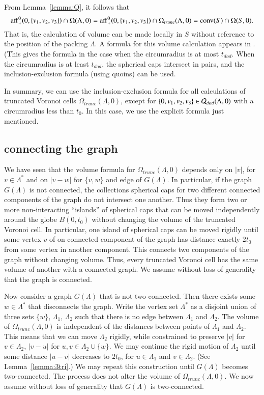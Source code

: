 From Lemma~\ref{lemma:Q}, it follows that
\begin{equation}\label{eqn:omega-3}
{\operatorname{aff}}^0_+(0,\{v_1,v_2,v_3\}) \cap \Omega(\Lambda,0) = 
{\operatorname{aff}}^0_+(0,\{v_1,v_2,v_3\}) \cap \Omega_{trunc}(\Lambda,0) = 
{\operatorname{conv}}(S)\cap\Omega(S,0).
\end{equation}
That is, the calculation of volume can be made locally in $S$ without
reference to the position of the packing $\Lambda$.
A formula for this volume calculation appears in 
\cite[sec.~8.6.3]{Part1}.  (This gives the formula in the case
when the circumradius is at most $t_{dod}$.  When the circumradius
is at least $t_{dod}$, the spherical caps intersect in pairs,
and the inclusion-exclusion formula (using quoins)
can be used.

In summary, we can use the inclusion-exclusion formula for all
calculations of truncated Voronoi cells $\Omega_{trunc}(\Lambda,0)$,
except for $\{0,v_1,v_2,v_3\}\in {\mathcal Q}_{dod}(\Lambda,0)$ with
a circumradius less than $t_0$.  In this case, we use
the explicit formula just mentioned.

\subsection{connecting the graph}

We have seen that the volume formula for $\Omega_{trunc}(\Lambda,0)$
depends only on $|v|$, for $v\in\Lambda^*$ and on
$|v-w|$ for $\{v,w\}$ and edge of $G(\Lambda)$.
In particular, if the graph $G(\Lambda)$ is not connected, the
collections spherical caps for two different connected components
of the graph do not intersect one another.  Thus they form
two or more non-interacting ``islands'' of spherical caps that
can be moved independently around the globe $B(0,t_0)$
without changing the volume of
the truncated Voronoi cell.  In particular, one island of spherical
caps can be moved rigidly until some vertex $v$ of on connected
component of the graph has distance exactly $2t_0$ from some
vertex in another component.  This connects two components of the
graph without changing volume.  Thus, every truncated Voronoi cell
has the same volume of another with a connected graph.  We
assume without loss of generality that the graph is connected.

Now consider a graph $G(\Lambda)$ that is not two-connected.
Then there exists some $w\in \Lambda^*$ that disconnects
the graph.  Write the vertex set $\Lambda^*$
as a disjoint union of three sets
$\{w\}$, $\Lambda_1$, $\Lambda_2$ such that there is no edge between
$\Lambda_1$ and $\Lambda_2$.  The volume of $\Omega_{trunc}(\Lambda,0)$
is independent of the distances between points of $\Lambda_1$ and
$\Lambda_2$.  This means that we can move $\Lambda_2$ rigidly,
while constrained to preserve $|v|$ for $v\in\Lambda_2$, $|v-u|$
for $u,v\in \Lambda_2\cup\{w\}$. 
We may continue the rigid motion of $\Lambda_2$ until some distance
$|u-v|$ decreases to $2t_0$, for
$u\in\Lambda_1$ and $v\in\Lambda_2$. (See Lemma~\ref{lemma:3tri}.) 
We may repeat this construction until $G(\Lambda)$ becomes two-connected.  The process does not alter the volume of $\Omega_{trunc}(\Lambda,0)$.
We now assume without loss of generality that $G(\Lambda)$ is
two-connected.



